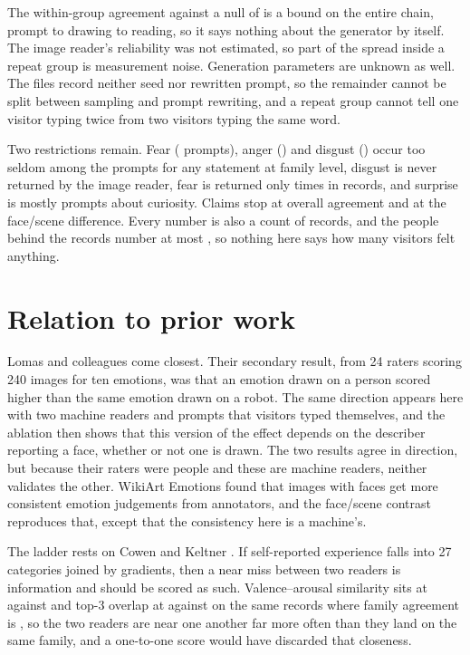The \ConsFam{} within-group agreement against a null of \ConsFamNull{} is a bound on the entire chain, prompt to drawing to reading, so it says nothing about the generator by itself. The image reader's reliability was not estimated, so part of the spread inside a repeat group is measurement noise. Generation parameters are unknown as well. The files record neither seed nor rewritten prompt, so the remainder cannot be split between sampling and prompt rewriting, and a repeat group cannot tell one visitor typing twice from two visitors typing the same word.

Two restrictions remain. Fear (\RecFearN{} prompts), anger (\RecAngerN{}) and disgust (\RecDisgustN{}) occur too seldom among the prompts for any statement at family level, disgust is never returned by the image reader, fear is returned only \famImageFear{} times in \nAnalysed{} records, and surprise is mostly prompts about curiosity. Claims stop at overall agreement and at the face/scene difference. Every number is also a count of records, and the people behind the \nAnalysed{} records number at most \nDistinct{}, so nothing here says how many visitors felt anything.

\section{Relation to prior work}
\label{sec:disc-prior}

Lomas and colleagues \cite{lomas2024improved} come closest. Their secondary result, from 24 raters scoring 240 images for ten emotions, was that an emotion drawn on a person scored higher than the same emotion drawn on a robot. The same direction appears here with two machine readers and prompts that visitors typed themselves, and the ablation then shows that this version of the effect depends on the describer reporting a face, whether or not one is drawn. The two results agree in direction, but because their raters were people and these are machine readers, neither validates the other. WikiArt Emotions \cite{mohammad2018wikiart} found that images with faces get more consistent emotion judgements from annotators, and the face/scene contrast reproduces that, except that the consistency here is a machine's.

The ladder rests on Cowen and Keltner \cite{cowen2017self}. If self-reported experience falls into 27 categories joined by gradients, then a near miss between two readers is information and should be scored as such. Valence--arousal similarity sits at \FullEmoVaObs{} against \FullEmoVaNull{} and top-3 overlap at \FullEmoOvlpObs{} against \FullEmoOvlpNull{} on the same records where family agreement is \FullEmoFamObs{}, so the two readers are near one another far more often than they land on the same family, and a one-to-one score would have discarded that closeness.

